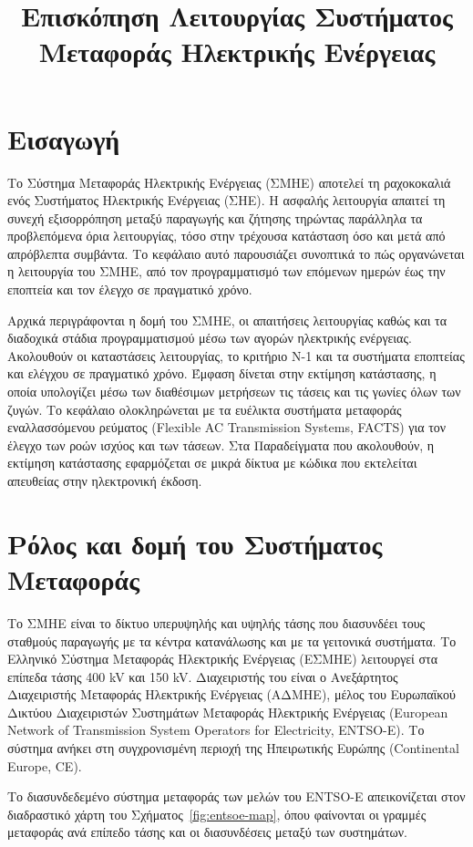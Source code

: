 \title{Επισκόπηση Λειτουργίας Συστήματος Μεταφοράς Ηλεκτρικής Ενέργειας}

\section{Εισαγωγή}
\label{kef-01-theoria}

Το Σύστημα Μεταφοράς Ηλεκτρικής Ενέργειας (ΣΜΗΕ) αποτελεί τη ραχοκοκαλιά ενός Συστήματος
Ηλεκτρικής Ενέργειας (ΣΗΕ). Η ασφαλής λειτουργία απαιτεί τη συνεχή εξισορρόπηση μεταξύ
παραγωγής και ζήτησης τηρώντας παράλληλα τα προβλεπόμενα όρια λειτουργίας, τόσο στην τρέχουσα κατάσταση όσο
και μετά από απρόβλεπτα συμβάντα. Το κεφάλαιο αυτό παρουσιάζει συνοπτικά το πώς οργανώνεται η
λειτουργία του ΣΜΗΕ, από τον προγραμματισμό των επόμενων ημερών έως την εποπτεία και τον
έλεγχο σε πραγματικό χρόνο.

Αρχικά περιγράφονται η δομή του ΣΜΗΕ, οι απαιτήσεις λειτουργίας καθώς και τα
διαδοχικά στάδια προγραμματισμού μέσω των αγορών ηλεκτρικής ενέργειας. Ακολουθούν οι καταστάσεις λειτουργίας, το κριτήριο N-1 και τα συστήματα εποπτείας και ελέγχου σε πραγματικό χρόνο. Έμφαση δίνεται στην εκτίμηση κατάστασης, η οποία υπολογίζει μέσω των διαθέσιμων μετρήσεων τις τάσεις και τις γωνίες όλων των ζυγών. Το κεφάλαιο ολοκληρώνεται με τα ευέλικτα συστήματα μεταφοράς
εναλλασσόμενου ρεύματος (Flexible AC Transmission Systems, FACTS) για τον έλεγχο των ροών
ισχύος και των τάσεων. Στα Παραδείγματα που ακολουθούν, η εκτίμηση κατάστασης εφαρμόζεται σε
μικρά δίκτυα με κώδικα που εκτελείται απευθείας στην ηλεκτρονική έκδοση.

\section{Ρόλος και δομή του Συστήματος Μεταφοράς}

Το ΣΜΗΕ είναι το δίκτυο υπερυψηλής και υψηλής τάσης που διασυνδέει τους σταθμούς παραγωγής με τα κέντρα κατανάλωσης και με τα γειτονικά
συστήματα. Το Ελληνικό Σύστημα Μεταφοράς Ηλεκτρικής Ενέργειας (ΕΣΜΗΕ) λειτουργεί στα επίπεδα
τάσης 400 kV και 150 kV. Διαχειριστής του είναι ο Ανεξάρτητος Διαχειριστής Μεταφοράς
Ηλεκτρικής Ενέργειας (ΑΔΜΗΕ), μέλος του Ευρωπαϊκού Δικτύου Διαχειριστών Συστημάτων Μεταφοράς
Ηλεκτρικής Ενέργειας (European Network of Transmission System
Operators for Electricity, ENTSO-E). Το σύστημα ανήκει στη
συγχρονισμένη περιοχή της Ηπειρωτικής Ευρώπης (Continental Europe, CE).

Το διασυνδεδεμένο σύστημα μεταφοράς των μελών του ENTSO-E απεικονίζεται στον διαδραστικό
χάρτη του Σχήματος~\ref{fig:entsoe-map}, όπου φαίνονται οι γραμμές μεταφοράς ανά επίπεδο
τάσης και οι διασυνδέσεις μεταξύ των συστημάτων.

